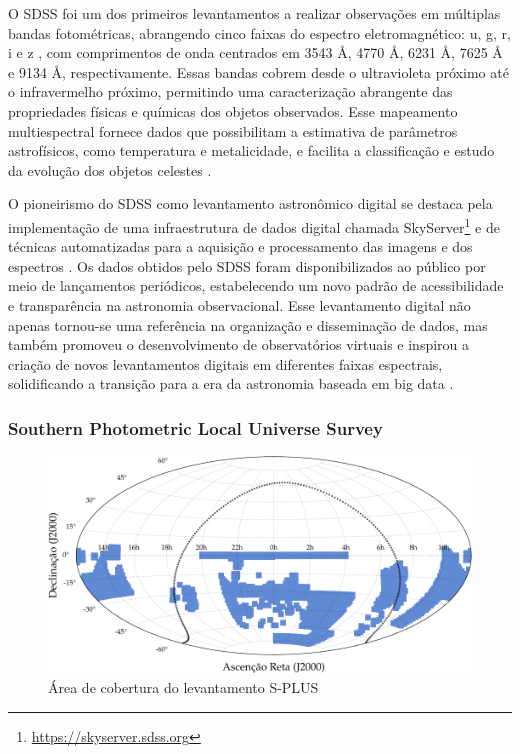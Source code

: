 O SDSS foi um dos primeiros levantamentos a realizar observações em múltiplas bandas fotométricas, abrangendo cinco faixas do espectro eletromagnético: u, g, r, i e z \citep{sdss-filters}, com comprimentos de onda centrados em 3543 $\si{\angstrom}$, 4770 $\si{\angstrom}$, 6231 $\si{\angstrom}$, 7625 $\si{\angstrom}$ e 9134 $\si{\angstrom}$, respectivamente. Essas bandas cobrem desde o ultravioleta próximo até o infravermelho próximo, permitindo uma caracterização abrangente das propriedades físicas e químicas dos objetos observados. Esse mapeamento multiespectral fornece dados que possibilitam a estimativa de parâmetros astrofísicos, como temperatura e metalicidade, e facilita a classificação e estudo da evolução dos objetos celestes \citep{sdss-photo}.

O pioneirismo do SDSS como levantamento astronômico digital se destaca pela implementação de uma infraestrutura de dados digital chamada SkyServer\footnote{\url{https://skyserver.sdss.org}} \citep{skyserver} e de técnicas automatizadas para a aquisição e processamento das imagens \citep{sdss-photo} e dos espectros \citep{sdss-spec}. Os dados obtidos pelo SDSS foram disponibilizados ao público por meio de lançamentos periódicos, estabelecendo um novo padrão de acessibilidade e transparência na astronomia observacional. Esse levantamento digital não apenas tornou-se uma referência na organização e disseminação de dados, mas também promoveu o desenvolvimento de observatórios virtuais e inspirou a criação de novos levantamentos digitais em diferentes faixas espectrais, solidificando a transição para a era da astronomia baseada em big data \citep{sciserver}.





\subsubsection{Southern Photometric Local Universe Survey}
\label{sec:splus}

\begin{figure}[!ht]
  \includegraphics[width=\linewidth]{notebooks/plots/splus_footprint.pdf}
  \caption{Área de cobertura do levantamento S-PLUS}
  \label{fig:coverage-splus}
\end{figure}

